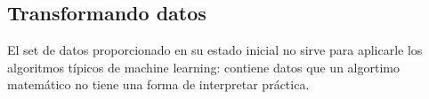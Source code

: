 

\subsection{Transformando datos} %
\label{sub:transformando_datos}

El set de datos proporcionado en su estado inicial no sirve para aplicarle los algoritmos típicos de machine learning: contiene datos que un algortimo matemático no tiene una forma de interpretar práctica.

